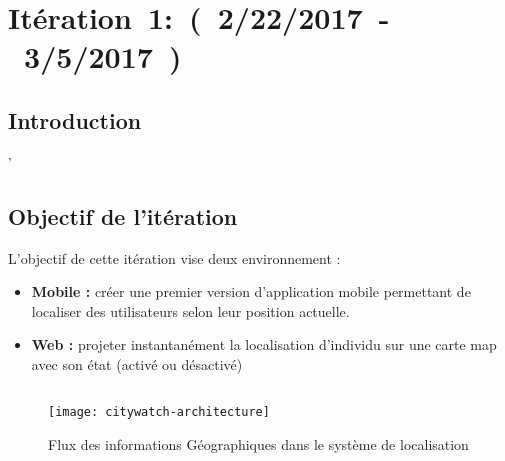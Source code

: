 \section{Itération~1:~(~2/22/2017~-~3/5/2017~)}
\subsection{Introduction}
'
\subsection{Objectif de l'itération}

L'objectif de cette itération vise deux environnement :
\begin{itemize}
 \item \textbf{Mobile :} créer une premier version d'application mobile permettant de localiser 
des utilisateurs selon leur position actuelle.
\item \textbf{Web :} projeter instantanément la localisation d'individu sur une carte map avec son état
(activé ou désactivé)
\end{itemize}
\subsection*{}
\begin{figure}[htbp]
  \centering
  \texttt{[image: citywatch-architecture]}
  \caption[Flux des information Géographiques en CityWatch]
  {Flux des informations Géographiques dans le système de localisation}
  \label{fig:citywatch-architecture}
\end{figure}






